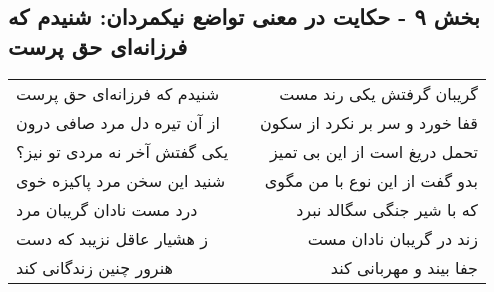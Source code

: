 \begin{center}
\section*{بخش ۹ - حکایت در معنی تواضع نیکمردان: شنیدم که فرزانه‌ای حق پرست}
\label{sec:009}
\begin{longtable}{l p{0.5cm} r}
شنیدم که فرزانه‌ای حق پرست
&&
گریبان گرفتش یکی رند مست
\\
از آن تیره دل مرد صافی درون
&&
قفا خورد و سر بر نکرد از سکون
\\
یکی گفتش آخر نه مردی تو نیز؟
&&
تحمل دریغ است از این بی تمیز
\\
شنید این سخن مرد پاکیزه خوی
&&
بدو گفت از این نوع با من مگوی
\\
درد مست نادان گریبان مرد
&&
که با شیر جنگی سگالد نبرد
\\
ز هشیار عاقل نزیبد که دست
&&
زند در گریبان نادان مست
\\
هنرور چنین زندگانی کند
&&
جفا بیند و مهربانی کند
\\
\end{longtable}
\end{center}
